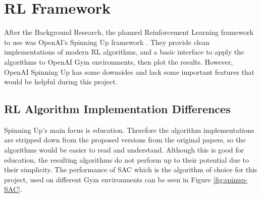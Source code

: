 \documentclass[12pt,twoside]{report}
\begin{document}
\section{RL Framework}
After the Background Research, the planned Reinforcement Learning framework to use was OpenAI's Spinning Up framework \cite{SpinningUp2018}. They provide clean implementations of modern RL algorithms, and a basic interface to apply the algorithms to OpenAI Gym environments, then plot the results. However, OpenAI Spinning Up has some downsides and lack some important features that would be helpful during this project.

\subsection{RL Algorithm Implementation Differences} \label{RLF:imp-diff}
Spinning Up's main focus is education. Therefore the algorithm implementations are stripped down from the proposed versions from the original papers, so the algorithms would be easier to read and understand. Although this is good for education, the resulting algorithms do not perform up to their potential due to their simplicity. The performance of SAC which is the algorithm of choice for this project, used on different Gym environments can be seen in Figure \ref{fig:spinup-SAC}.
\end{document}
